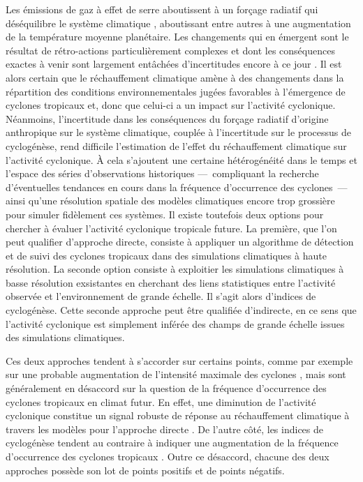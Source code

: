 \documentclass[../main.tex]{subfiles}
\begin{document}
Les émissions de gaz à effet de serre aboutissent à un forçage radiatif qui déséquilibre le système climatique \parencite{charney_carbon_1979}, aboutissant
entre autres à une augmentation de la température moyenne planétaire. Les changements qui en émergent sont le résultat de rétro-actions particulièrement
complexes et dont les conséquences exactes à venir sont largement entâchées d'incertitudes encore à ce jour \parencite{seneviratne_weather_2021}. Il est alors
certain que le réchauffement climatique amène à des changements dans la répartition des conditions environnementales jugées favorables à l'émergence de cyclones
tropicaux et, donc que celui-ci a un impact sur l'activité cyclonique. Néanmoins, l'incertitude dans les conséquences du forçage radiatif d'origine anthropique
sur le système climatique, couplée à l'incertitude sur le processus de cyclogénèse, rend difficile l'estimation de l'effet du réchauffement climatique sur
l'activité cyclonique. À cela s'ajoutent une certaine hétérogénéité dans le temps et l'espace des séries d'observations historiques ---~compliquant la recherche
d'éventuelles tendances en cours dans la fréquence d'occurrence des cyclones~--- ainsi qu'une résolution spatiale des modèles climatiques encore trop grossière
pour simuler fidèlement ces systèmes. Il existe toutefois deux options pour chercher à évaluer l'activité cyclonique tropicale future. La première, que l'on
peut qualifier d'approche directe, consiste à appliquer un algorithme de détection et de suivi des cyclones tropicaux dans des simulations climatiques à haute
résolution. La seconde option consiste à exploitier les simulations climatiques à basse résolution exsistantes en cherchant des liens statistiques entre
l'activité observée et l'environnement de grande échelle. Il s'agit alors d'indices de cyclogénèse. Cette seconde approche peut être qualifiée d'indirecte, en
ce sens que l'activité cyclonique est simplement inférée des champs de grande échelle issues des simulations climatiques.

Ces deux approches tendent à s'accorder sur certains points, comme par exemple sur une probable augmentation de l'intensité maximale des cyclones
\parencite{sobel_human_2016,bhatia_projected_2018}, mais sont généralement en désaccord sur la question de la fréquence d'occurrence des cyclones tropicaux en
climat futur. En effet, une diminution de l'activité cyclonique constitue un signal robuste de réponse au réchauffement climatique à travers les modèles pour
l'approche directe \parencite{christensen_climate_2013,knutson_tropical_2020}. De l'autre côté, les indices de cyclogénèse tendent au contraire à indiquer une
augmentation de la fréquence d'occurrence des cyclones tropicaux \parencite{emanuel_downscaling_2013,camargo_testing_2014}. Outre ce désaccord, chacune des deux
approches possède son lot de points positifs et de points négatifs.
\end{document}
